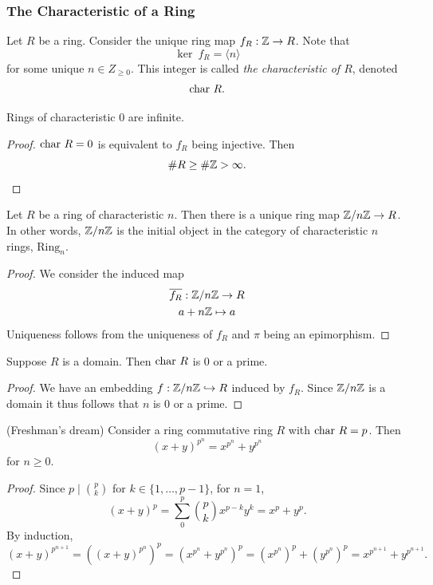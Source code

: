 \subsubsection{The Characteristic of a Ring}
\begin{definition}
    Let $R$ be a ring. Consider the unique ring map $f_R : \mathbb{Z} \rightarrow R$. Note that 
    $$
        \ker \ f_R = \langle n\rangle 
    $$
    for some unique $n\in Z_{\geq 0}$. This integer is called \emph{the characteristic of $R$}, denoted 
    $$
        \mathrm{char}\ R.
    $$
\end{definition}
\begin{lemma}
    Rings of characteristic $0$ are infinite.
\end{lemma}
\begin{proof}
    $\mathrm{char}\ R = 0$ is equivalent to $f_R$ being injective. Then 
    $$
        \# R\geq \#\mathbb{Z} >\infty.  
    $$
\end{proof}
\begin{lemma}
    Let $R$ be a ring of characteristic $n$. Then there is a unique ring map $\mathbb{Z}/n\mathbb{Z}\rightarrow R$. In other words, $\mathbb{Z}/n\mathbb{Z}$ is the initial object in the category of characteristic $n$ rings, $\mathrm{Ring}_n$.
\end{lemma}
\begin{proof}
    We consider the induced map 
    \begin{gather*}
        \overline{f_R} : \mathbb{Z}/n\mathbb{Z} \rightarrow R\\
        a + n\mathbb{Z} \mapsto a 
    \end{gather*}
    Uniqueness follows from the uniqueness of $f_R$ and $\pi$ being an epimorphism. 
\end{proof}
\begin{lemma}
    Suppose $R$ is a domain. Then $\mathrm{char}\ R$ is $0$ or a prime. 
\end{lemma}
\begin{proof}
    We have an embedding $f:\mathbb{Z}/n\mathbb{Z} \hookrightarrow R$ induced by $f_R$. Since $\mathbb{Z}/n\mathbb{Z}$ is a domain it thus follows that $n$ is $0$ or a prime.  
\end{proof}
\begin{lemma}(Freshman's dream)
    Consider a ring commutative ring $R$ with $\mathrm{char} \ R = p$. Then 
    $$
        (x+y)^{p^n}=x^{p^n}+y^{p^n}
    $$ 
    for $n\geq 0$.
\end{lemma}
\begin{proof}
    Since $p\mid {p \choose k}$ for $k\in\{1,\dots,p-1\}$, for $n=1$,
    $$
        (x+y)^p = \sum_0^p {p \choose k}x^{p-k}y^{k} = x^p + y^p. 
    $$
    By induction, 
    $$
        (x+y)^{p^{n+1}} = \left((x+y)^{p^n}\right)^p= \left(x^{p^n} + y^{p^n}\right)^p = \left(x^{p^n}\right)^p +  \left(y^{p^n}\right)^p = x^{p^{n+1}} + y^{p^{n+1}}.
    $$
\end{proof}
